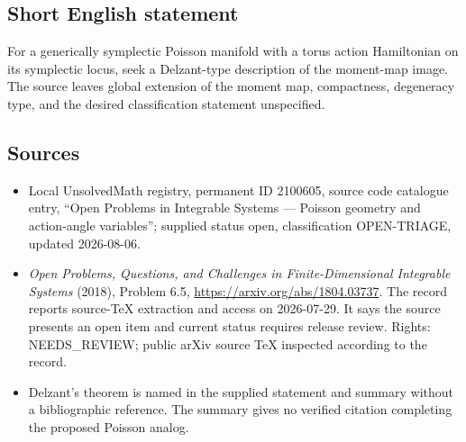 \documentclass[11pt]{article}
\begin{document}
\subsection{Short English statement}
For a generically symplectic Poisson manifold with a torus action Hamiltonian on its symplectic locus, seek a Delzant-type description of the moment-map image. The source leaves global extension of the moment map, compactness, degeneracy type, and the desired classification statement unspecified.
\subsection{Sources}
\begin{itemize}
\item Local UnsolvedMath registry, permanent ID 2100605, source code catalogue entry, ``Open Problems in Integrable Systems --- Poisson geometry and action-angle variables''; supplied status open, classification OPEN-TRIAGE, updated 2026-08-06.
\item \emph{Open Problems, Questions, and Challenges in Finite-Dimensional Integrable Systems} (2018), Problem 6.5, \url{https://arxiv.org/abs/1804.03737}. The record reports source-TeX extraction and access on 2026-07-29. It says the source presents an open item and current status requires release review. Rights: NEEDS\_REVIEW; public arXiv source TeX inspected according to the record.
\item Delzant's theorem is named in the supplied statement and summary without a bibliographic reference. The summary gives no verified citation completing the proposed Poisson analog.
\end{itemize}
\end{document}
